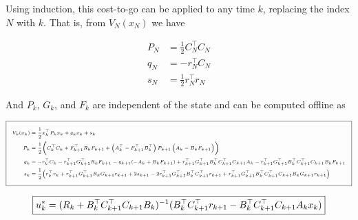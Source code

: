 \documentclass[11pt,letterpaper,onecolumn,notitlepage]{article}
\begin{document}
Using induction, this cost-to-go can be applied to any time $k$, replacing the index $N$ with $k$.
That is, from $V_{N}(x_{N})$ we have

\begin{equation*}
  \begin{split}
    P_{N}&=\frac{1}{2}C_{N}^{\top}C_{N} \\
    q_{N}&=-r_{N}^{\top}C_{N} \\
    s_{N}&=\frac{1}{2}r_{N}^{\top}r_{N}
  \end{split}
\end{equation*}

And $P_{k}$, $G_{k}$, and $F_{k}$ are independent of the state and can be computed offline as

\begin{equation*}
  \fontsize{6pt}{1pt}\selectfont
  \addtolength{\fboxsep}{5pt}
  \boxed{%
    \begin{split}
      V_{k}(x_{k})&=\frac{1}{2}x_{k}^{\top}P_{k}x_{k}+q_{k}x_{k}+s_{k} \\
      P_{k}&=\frac{1}{2}\biggr(C_{k}^{\top}C_{k}+F_{k+1}^{\top}R_{k}F_{k+1}+\left(A_{k}^{\top}-F_{k+1}^{\top}B_{k}^{\top}\right)P_{k+1}\left(A_{k}-B_{k}F_{k+1}\right)\biggr) \\
      q_{k}&=-r_{k}^{\top}C_{k}-r_{k+1}^{\top}G_{k+1}^{\top}R_{k}F_{k+1}-q_{k+1}(-A_{k}+B_{k}F_{k+1})+r_{k+1}^{\top}G_{k+1}^{\top}B_{k}^{\top}C_{k+1}^{\top}C_{k+1}A_{k}-r_{k+1}^{\top}G_{k+1}^{\top}B_{k}^{\top}C_{k+1}^{\top}C_{k+1}B_{k}F_{k+1} \\
      s_{k}&=\frac{1}{2}\bigr(r_{k}^{\top}r_{k}+r_{k+1}^{\top}G_{k+1}^{\top}R_{k}G_{k+1}r_{k+1}+2s_{k+1}-2r_{k+1}^{\top}G_{k+1}^{\top}B_{k}^{\top}C_{k+1}^{\top}r_{k+1}+r_{k+1}^{\top}G_{k+1}^{\top}B_{k}^{\top}C_{k+1}^{\top}C_{k+1}B_{k}G_{k+1}r_{k+1}\bigr)
    \end{split}
  }
\end{equation*}

\begin{equation*}
  \boxed{%
    u_{k}^{*}=(R_{k}+B_{k}^{\top}C_{k+1}^{\top}C_{k+1}B_{k})^{-1}(B_{k}^{\top}C_{k+1}^{\top}r_{k+1}-B_{k}^{\top}C_{k+1}^{\top}C_{k+1}A_{k}x_{k})
  }
\end{equation*}

\end{document}

